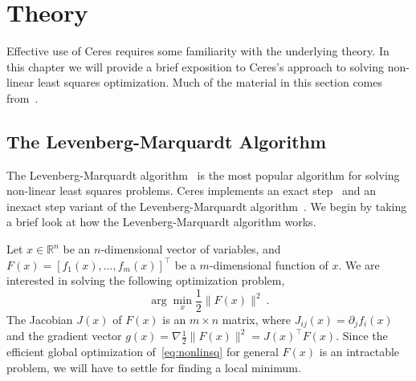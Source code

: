 \chapter{Theory}
\label{chapter:theory}
Effective use of Ceres requires some familiarity with the underlying theory. In this chapter we will provide a brief exposition to Ceres's approach to solving non-linear least squares optimization. Much of the material in this section comes from~\cite{Agarwal10bal,wu2011multicore,kushal2012}.

\section{The Levenberg-Marquardt Algorithm}

The Levenberg-Marquardt algorithm~\cite{levenberg1944method, marquardt1963algorithm} is the most popular algorithm for solving non-linear least squares problems. Ceres implements an exact step~\cite{madsen2004methods} and an inexact step variant of the Levenberg-Marquardt algorithm~\cite{wright1985inexact,nash1990assessing}.  We begin by taking a brief look at how the Levenberg-Marquardt algorithm works.


Let $x \in \mathbb{R}^{n}$ be an $n$-dimensional vector of variables, and
$ F(x) = \left[f_1(x),   \hdots,  f_{m}(x) \right]^{\top}$ be a $m$-dimensional function of $x$.  We are interested in solving the following optimization problem,
\begin{equation}
        \arg \min_x \frac{1}{2}\|F(x)\|^2\ .
        \label{eq:nonlinsq}
\end{equation}
The Jacobian $J(x)$ of $F(x)$ is an $m\times n$ matrix, where $J_{ij}(x) = \partial_j f_i(x)$  and the gradient vector $g(x) = \nabla  \frac{1}{2}\|F(x)\|^2 = J(x)^\top F(x)$. Since the efficient global optimization of~\eqref{eq:nonlinsq} for general $F(x)$ is an intractable problem, we will have to settle for finding a local minimum.

